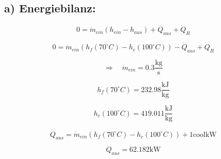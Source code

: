 \subsection*{a) Energiebilanz:}

\[
0 = \dot{m}_{ein} (h_{ein} - h_{aus}) + \dot{Q}_{aus} + \dot{Q}_R
\]

\[
0 = \dot{m}_{ein} \left( h_f(70^\circ C) - h_c(100^\circ C) \right) - \dot{Q}_{aus} + \dot{Q}_R
\]

\[
\Rightarrow \quad \dot{m}_{ein} = 0.3 \frac{\text{kg}}{\text{s}}
\]

\[
h_f(70^\circ C) = 232.98 \frac{\text{kJ}}{\text{kg}}
\]

\[
h_c(100^\circ C) = 419.011 \frac{\text{kJ}}{\text{kg}}
\]

\[
\dot{Q}_{aus} = \dot{m}_{ein} \left( h_f(70^\circ C) - h_c(100^\circ C) \right) + 1 \text{cool} \text{kW}
\]

\[
Q_{aus} = 62.182 \text{kW}
\]